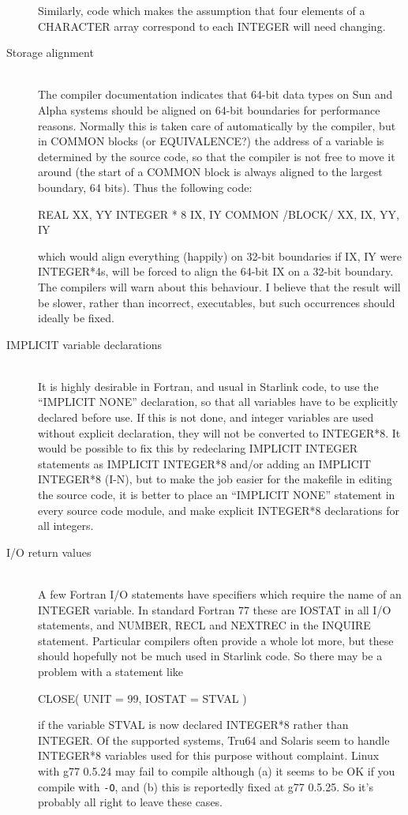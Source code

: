 \documentclass[twoside,11pt,nolof]{starlink}
\providecommand{\ditem}[1]{\item[#1]\mbox{}\\}
\newenvironment{squote}{\begin{small}}{\end{small}}
\begin{document}
\begin{description}
Similarly, code which makes the assumption that four elements of
a CHARACTER array correspond to each INTEGER will need changing.
%
\ditem{Storage alignment}
The compiler documentation indicates that
64-bit data types on Sun and Alpha systems should be aligned on
64-bit boundaries for performance reasons.
Normally this is taken care of automatically by the compiler,
but in COMMON blocks (or EQUIVALENCE?) the address of a
variable is determined by the source code, so that the compiler
is not free to move it around (the start of a COMMON block is
always aligned to the largest boundary, 64 bits).
Thus the following code:
\begin{squote}
\begin{terminalv}
      REAL        XX, YY
      INTEGER * 8 IX, IY
      COMMON /BLOCK/ XX, IX, YY, IY
\end{terminalv}
\end{squote}
which would align everything (happily) on 32-bit boundaries if IX, IY
were INTEGER*4s, will be forced to align the 64-bit IX on a 32-bit
boundary.
The compilers will warn about this behaviour.
I believe that the result will be slower, rather than incorrect,
executables,
but such occurrences should ideally be fixed.
%
\ditem{IMPLICIT variable declarations}
It is highly desirable in Fortran, and usual in Starlink code, to use
the ``IMPLICIT NONE'' declaration, so that all variables have to be
explicitly declared before use.
If this is not done, and integer variables are used without explicit
declaration, they will not be converted to INTEGER*8.
It would be possible to fix this by redeclaring IMPLICIT INTEGER
statements as IMPLICIT INTEGER*8 and/or adding an IMPLICIT INTEGER*8 (I-N),
but to make the job easier for
the makefile in editing the source code, it is better to place
an ``IMPLICIT NONE'' statement in every source code module, and
make explicit INTEGER*8 declarations for all integers.

%
\ditem{I/O return values}
A few Fortran I/O statements have specifiers which require the name
of an INTEGER variable.  In standard Fortran 77 these are
IOSTAT in all I/O statements, and
NUMBER, RECL and NEXTREC in the INQUIRE statement.
Particular compilers often provide a whole lot more, but these
should hopefully not be much used in Starlink code.
So there may be a problem with a statement like
\begin{squote}
\begin{terminalv}
      CLOSE( UNIT = 99, IOSTAT = STVAL )
\end{terminalv}
\end{squote}
if the variable STVAL is now declared INTEGER*8 rather than INTEGER.
Of the supported systems, Tru64 and Solaris seem to handle
INTEGER*8 variables used for this purpose without complaint.
Linux with g77 0.5.24 may fail to compile although (a) it seems to
be OK if you compile with \texttt{-O}, and (b) this is reportedly
fixed at g77 0.5.25.  So it's probably all right to leave these cases.
%
\end{description}
\end{document}
